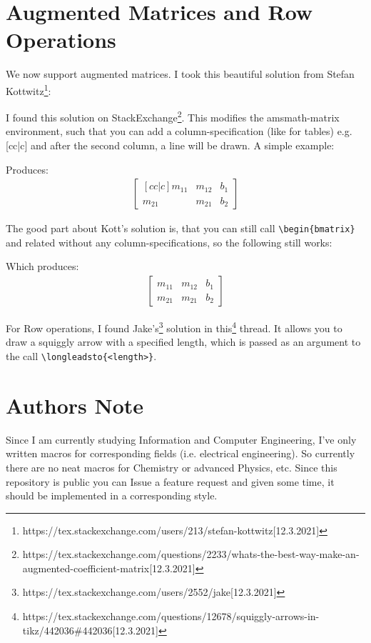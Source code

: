 \documentclass{report}
\begin{document}
  \section{Augmented Matrices and Row Operations}
    We now support augmented matrices. I took this beautiful solution from 
    Stefan Kottwitz\footnote{https://tex.stackexchange.com/users/213/stefan-kottwitz[12.3.2021]}:
    \begin{center}
      
    \end{center}
    I found this solution on 
    StackExchange\footnote{https://tex.stackexchange.com/questions/2233/whats-the-best-way-make-an-augmented-coefficient-matrix[12.3.2021]}. 
    This modifies the amsmath-matrix environment, such that you can add a column-specification (like for tables) e.g.
    [cc|c] and after the second column, a line will be drawn. A simple example:
    \begin{center}
      
    \end{center}
    Produces:
    \begin{align*}
      \begin{bmatrix}[cc|c]
        m_{11} & m_{12} & b_1\\
        m_{21} & m_{21} & b_2
      \end{bmatrix}
    \end{align*}

    The good part about Kott's solution is, that you can still call \lstinline|\begin{bmatrix}| and related without
    any column-specifications, so the following still  works:
    \begin{center}
      
    \end{center}
    Which produces:
    \begin{align*}
      \begin{bmatrix}
        m_{11} & m_{12} & b_1\\
        m_{21} & m_{21} & b_2
      \end{bmatrix}
    \end{align*}

    For Row operations, I found Jake's\footnote{https://tex.stackexchange.com/users/2552/jake[12.3.2021]} solution in
    this\footnote{https://tex.stackexchange.com/questions/12678/squiggly-arrows-in-tikz/442036\#442036[12.3.2021]} thread. It 
    allows you to draw a squiggly arrow with a specified length, which is passed as an argument to the call
    \lstinline|\longleadsto{<length>}|.
  \section{Authors Note}
    Since I am currently studying Information and Computer Engineering, I've only written macros for 
    corresponding fields (i.e. electrical engineering). So currently there are no neat macros for Chemistry or
    advanced Physics, etc. Since this repository is public you can Issue a feature request and given some 
    time, it should be implemented in a corresponding style.
\end{document}
